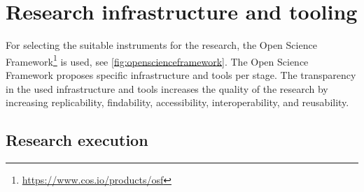\section{Research infrastructure and tooling}
\label{sec:researchinfraandtooling}
For selecting the suitable instruments for the research, the Open Science Framework\footnote{\url{https://www.cos.io/products/osf}} is used, see \cref{fig:openscienceframework}. The Open Science Framework proposes specific infrastructure and tools per stage. The transparency in the used infrastructure and tools increases the quality of the research by increasing replicability, findability, accessibility, interoperability, and reusability.
\subsection{Research execution}
\label{sub:tbresearchexecution}
